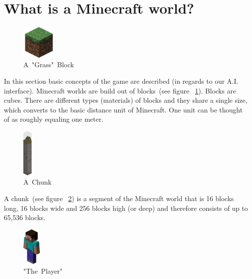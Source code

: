         \section{What is a Minecraft world?}

\begin{figure}
  \begin{center}
    \includegraphics[width=0.15\textwidth]{graphics/block}
  \end{center}
  \caption{A~"Grass"~Block~\cite{image_mob}}
  \label{mc_block}
\end{figure}

In this section basic concepts of the game are described (in regards to our A.I. interface). Minecraft worlds are build out of blocks~(see figure ~\ref{mc_block}). Blocks are cubes. There are different types (materials) of blocks and they share a single size, which converts to the basic distance unit of Minecraft. One unit can be thought of as roughly equaling one meter.

\begin{figure}
  \begin{center}
    \includegraphics[width=0.04\textwidth]{graphics/chunk}
  \end{center}
  \caption{A~Chunk~\cite{image_mob}}
  \label{mc_chunk}
\end{figure}  

A chunk~(see figure ~\ref{mc_chunk}) is a segment of the Minecraft world that is 16 blocks long, 16 blocks wide and 256 blocks high (or deep) and therefore consists of up to 65,536 blocks.~\cite{mcwiki_chunks}

\begin{figure}
  \begin{center}
    \includegraphics[width=0.08\textwidth]{graphics/player}
  \end{center}
  \caption{"The~Player"~\cite{image_mob}}
  \label{mc_player}
\end{figure} 

